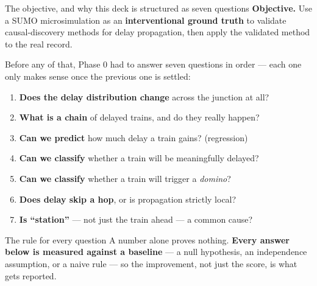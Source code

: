 \documentclass[aspectratio=169,10pt]{beamer}
\newcommand{\hl}[1]{{\color{corange}\textbf{#1}}}
\begin{document}
\begin{frame}{The objective, and why this deck is structured as seven questions}
  \textbf{Objective.} Use a SUMO microsimulation as an \hl{interventional ground
  truth} to validate causal-discovery methods for delay propagation, then apply the
  validated method to the real record.

  \vspace{0.6em}
  Before any of that, Phase 0 had to answer seven questions in order --- each one
  only makes sense once the previous one is settled:

  \vspace{0.4em}
  \begin{enumerate}
    \item \textbf{Does the delay distribution change} across the junction at all?
    \item \textbf{What is a chain} of delayed trains, and do they really happen?
    \item \textbf{Can we predict} how much delay a train gains? (regression)
    \item \textbf{Can we classify} whether a train will be meaningfully delayed?
    \item \textbf{Can we classify} whether a train will trigger a \emph{domino}?
    \item \textbf{Does delay skip a hop}, or is propagation strictly local?
    \item \textbf{Is ``station''} --- not just the train ahead --- a common cause?
  \end{enumerate}

  \vspace{0.7em}
  \begin{block}{\small The rule for every question}
    \small A number alone proves nothing. \textbf{Every answer below is measured
    against a baseline} --- a null hypothesis, an independence assumption, or a
    naive rule --- so the improvement, not just the score, is what gets reported.
  \end{block}
\end{frame}
\end{document}
